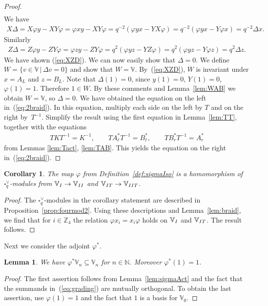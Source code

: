 \documentclass[11pt]{article}
\numberwithin{equation}{section}
\numberwithin{equation}{section}
\newtheorem{Corollary}[Theorem]{Corollary}
\newtheorem{Lemma}[Theorem]{Lemma}
\begin{document}
{\begin{proof}
\begin{gather}
\label{eq:XZD}
\end{gather}
We have
\begin{gather*}
X \Delta = X \varphi y - X Y \varphi
= \varphi x y - X Y \varphi
= q^{-2}(\varphi y x - Y X \varphi)
= q^{-2}(\varphi y x - Y \varphi x)
= q^{-2}\Delta x.
\end{gather*}
Similarly
\begin{gather*}
Z \Delta = Z \varphi y - Z Y \varphi
= \varphi z y - Z Y \varphi
= q^{2}(\varphi y z - Y Z \varphi)
= q^{2}(\varphi y z - Y \varphi z)
= q^{2}\Delta z.
\end{gather*}
We have shown (\ref{eq:XZD}). We can now easily show that $\Delta = 0$. We define $W=\lbrace v \in \mathbb V\,|\, \Delta v = 0\rbrace$ and show that $W=\mathbb V$. By~(\ref{eq:XZD}), $W$ is invariant under $x=A_L$ and $z=B_L$. Note that $\Delta (1)=0$, since $y(1)=0$, $Y(1)=0$, $\varphi (1)=1$. Therefore $1 \in W$.
By these comments and Lemma~\ref{lem:WAB} we obtain $W=\mathbb V$, so $\Delta=0$. We have obtained
the equation on the left in~(\ref{eq:2braid}). In this equation, multiply each side on the left by $T$ and on the right by~$T^{-1}$. Simplify the result using the first equation in Lemma~\ref{lem:TT}, together with the equations
\begin{gather*}
TKT^{-1}= K^{-1},\qquad T A^*_\ell T^{-1} = B^*_{\ell},\qquad T B^*_r T^{-1} = A^*_r
\end{gather*}
from Lemmas \ref{lem:Tact}, \ref{lem:TAB}. This yields the equation on the right in~(\ref{eq:2braid}).
\end{proof}

\begin{Corollary}\label{cor:hom}The map $\varphi$ from Definition~{\rm \ref{def:sigmaIso}} is a homomorphism of $\square^\vee_q$-modules from $\mathbb V_{\rm I} \to \mathbb V_{\rm II}$ and $\mathbb V_{\rm IT} \to \mathbb V_{\rm IIT}$.
\end{Corollary}
\begin{proof}The $\square^\vee_q$-modules in the corollary statement are described in Proposition~\ref{prop:fourmod2}. Using these descriptions and Lemma~\ref{lem:braid}, we find that for $i \in \mathbb Z_4$ the relation $ \varphi x_i = x_i \varphi$ holds on $\mathbb V_{\rm I}$ and $\mathbb V_{\rm IT}$. The result follows.
\end{proof}

Next we consider the adjoint $\varphi^*$.

\begin{Lemma}\label{lem:adjphi} We have $\varphi^* \mathbb V_n \subseteq \mathbb V_n$ for $n \in \mathbb N$. Moreover $\varphi^*(1)=1$.
\end{Lemma}
\begin{proof} The first assertion follows from Lemma~\ref{lem:sigmaAct} and the fact that the summands in~(\ref{eq:grading}) are mutually orthogonal. To obtain the last assertion, use $\varphi(1)=1$ and the
fact that $1$ is a basis for $\mathbb V_0$.
\end{proof}

}
\end{document}
